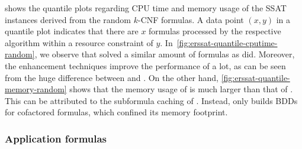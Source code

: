  shows the quantile plots regarding CPU time and memory usage
of the SSAT instances derived from the random $k$-CNF formulas.
A data point $(x,y)$ in a quantile plot indicates that
there are $x$ formulas processed by the respective algorithm within a resource constraint of $y$.
In~\cref{fig:erssat-quantile-cputime-random},
we observe that \erssat solved a similar amount of formulas as \dcssat did.
Moreover, the enhancement techniques improve the performance of \erssat a lot,
as can be seen from the huge difference between \erssat and \erssatb.
On the other hand,
\cref{fig:erssat-quantile-memory-random} shows that the memory usage of \dcssat is much larger than that of \erssat.
This can be attributed to the subformula caching of \dcssat.
Instead, \erssat only builds BDDs for cofactored formulas, which confined its memory footprint.

\subsubsection{Application formulas}

